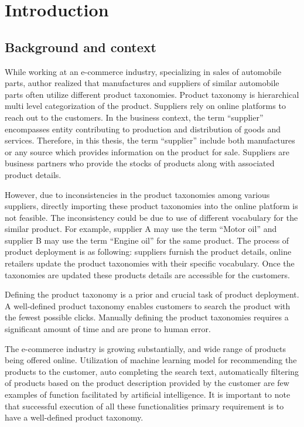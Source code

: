 \chapter{Introduction}

\section{Background and context}

While working at an e-commerce industry, specializing in sales of automobile parts, author realized that manufactures and suppliers of similar automobile parts often utilize different product taxonomies. Product taxonomy is hierarchical multi level categorization of the product.  Suppliers rely on online platforms to reach out to the customers. In the business context, the term ``supplier'' encompasses entity contributing to production and distribution of goods and services. Therefore, in this thesis, the term ``supplier'' include both manufactures or any source which provides information on the product for sale. Suppliers are business partners who provide the stocks of products along with associated product details.

However, due to inconsistencies in the product taxonomies among various suppliers, directly importing these product taxonomies into the online platform is not feasible. The inconsistency could be due to use of different vocabulary for the similar product. For example, supplier A may use the term ``Motor oil'' and supplier B may use the term ``Engine oil'' for the same product. The process of product deployment is as following: suppliers furnish the product details, online retailers update the product taxonomies with their specific vocabulary. Once the taxonomies are updated these products details are accessible for the customers.

Defining the product taxonomy is a prior and crucial task of product deployment. A well-defined product taxonomy enables customers to search the product with the fewest possible clicks.  Manually defining the product taxonomies requires a significant amount of time and are prone to human error. 

The e-commerce industry is growing substantially, and wide range of products being offered online. Utilization of machine learning model for recommending the products to the customer, auto completing the search text, automatically filtering of products based on the product description provided by the customer are few examples of function facilitated by artificial intelligence. It is important to note that successful execution of all these functionalities primary requirement is to have a well-defined product taxonomy.

